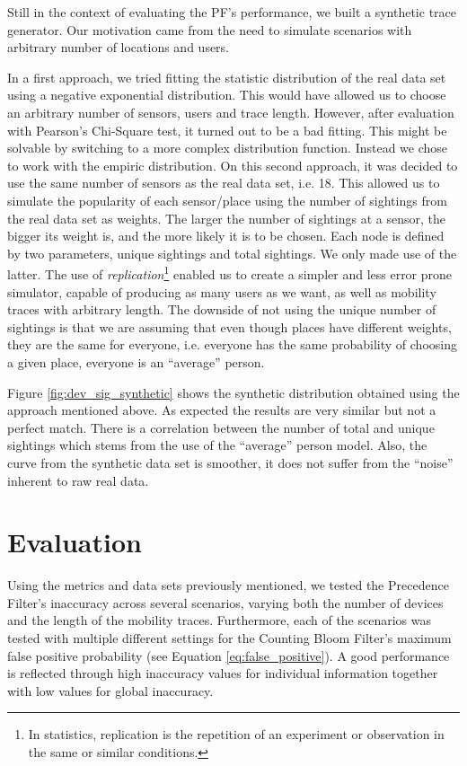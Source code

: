 Still in the context of evaluating the PF's performance, we built a
synthetic trace generator. Our motivation came from the need to
simulate scenarios with arbitrary number of locations and users.

In a first approach, we tried fitting the statistic distribution of
the real data set using a negative exponential distribution. This
would have allowed us to choose an arbitrary number of sensors, users
and trace length. However, after evaluation with Pearson's Chi-Square
test, it turned out to be a bad fitting. This might be solvable by
switching to a more complex distribution function. Instead we chose to
work with the empiric distribution.
On this second approach, it was decided to use the same number of sensors
as the real data set, i.e. 18. This allowed us to simulate the
popularity of each sensor/place using the number of sightings from the
real data set as weights. The larger the number of sightings at a
sensor, the bigger its weight is, and the more likely it is to be
chosen. Each node is defined by two parameters, unique sightings and
total sightings. We only made use of the latter. The use of
\emph{replication}\footnote{In statistics, replication is the
  repetition of an experiment or observation in the same or similar
  conditions.} enabled us to create  a simpler and less error prone
simulator, capable of producing as many users as we want, as well as
mobility traces with arbitrary length.  The downside of not using the
unique number of sightings is that we are assuming that even though
places have different weights, they are the same for everyone,
i.e. everyone has the same probability of choosing a given place,
everyone is an ``average'' person.

Figure \ref{fig:dev_sig_synthetic} shows the synthetic distribution
obtained using the approach mentioned above.  As expected the results
are very similar but not a perfect match. There is a
correlation between the number of total and unique sightings which
stems from the use of the ``average'' person model. Also, the curve from the
synthetic data set is smoother, it does not suffer from the
``noise'' inherent to raw real data.

\section{Evaluation}
\label{sec:ct-evaluation}

Using the metrics and data sets previously mentioned, we tested the
Precedence Filter's inaccuracy across several scenarios, varying both
the number of devices and the length of the mobility traces.
Furthermore, each of the scenarios was tested with multiple different
settings for the Counting Bloom Filter's maximum false positive
probability (see Equation \ref{eq:false_positive}).
A good performance is reflected through high inaccuracy values for
individual information together with low values for global inaccuracy.


